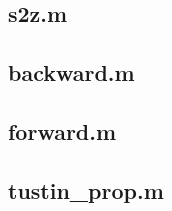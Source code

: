 \documentclass[twoside, fleqn]{article}
\begin{document}
    \subsection*{s2z.m}
    \label{subsec:s2z}
    
    
    \subsection*{backward.m}
    \label{subsec:backward}
    
    
    \subsection*{forward.m}
    \label{subsec:forward}
    
    
    \subsection*{tustin\_prop.m}
    \label{subsec:tustin}
    
    
\end{document}
